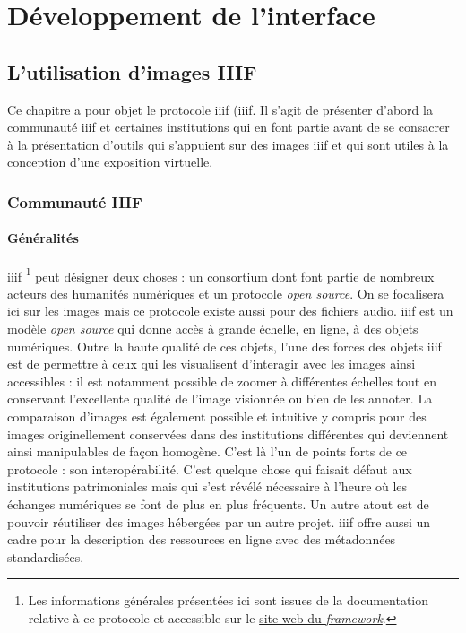 \part{Développement de l'interface}
	
	\chapter{L’utilisation d’images IIIF}
	Ce chapitre a pour objet le protocole \acrshort{iiif} (\acrlong{iiif}. Il s'agit de présenter d'abord la communauté \acrshort{iiif} et certaines institutions qui en font partie avant de se consacrer à la présentation d'outils qui s'appuient sur des images \acrshort{iiif} et qui sont utiles à la conception d'une exposition virtuelle. 
	
	\section{Communauté IIIF}
	\subsection{Généralités}
	\acrshort{iiif} \footnote{Les informations générales présentées ici sont issues de la documentation relative à ce protocole et accessible sur le \href{https://iiif.io/get-started/how-iiif-works/}{site web du \textit{framework}}.} peut désigner deux choses : un consortium dont font partie de nombreux acteurs des humanités numériques et un protocole \textit{open source}. On se focalisera ici sur les images mais ce protocole existe aussi pour des fichiers audio. \acrshort{iiif} est un modèle \textit{open source} qui donne accès à grande échelle, en ligne, à des objets numériques. Outre la haute qualité de ces objets, l'une des forces des objets \acrshort{iiif} est de permettre à ceux qui les visualisent d'interagir avec les images ainsi accessibles : il est notamment possible de zoomer à différentes échelles tout en conservant l'excellente qualité de l'image visionnée ou bien de les annoter. La comparaison d'images est également possible et intuitive y compris pour des images originellement conservées dans des institutions différentes qui deviennent ainsi manipulables de façon homogène. C'est là l'un de points forts de ce protocole : son interopérabilité. C'est quelque chose qui faisait défaut aux institutions patrimoniales mais qui s'est révélé nécessaire à l'heure où les échanges numériques se font de plus en plus fréquents. Un autre atout est de pouvoir réutiliser des images hébergées par un autre projet. \acrshort{iiif} offre aussi un cadre pour la description des ressources en ligne avec des métadonnées standardisées. 
	
